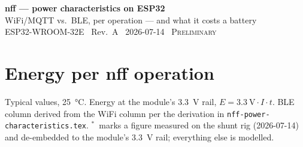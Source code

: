 \documentclass[10pt,a4paper]{article}
\newcommand{\meas}{\textcolor{ok}{$^{\ast}$}}
\begin{document}
{\LARGE\textbf{nff --- power characteristics on ESP32}}\\[1.5mm]
{\large WiFi/MQTT vs.\ BLE, per operation --- and what it costs a battery}\\[1mm]
{\small ESP32-WROOM-32E \textbullet\ Rev.\ A \textbullet\ 2026-07-14 \textbullet\ \textsc{Preliminary}}


\section{Energy per nff operation}
\label{sec:ops}

Typical values, \SI{25}{\celsius}. Energy at the module's \SI{3.3}{\volt} rail,
$E = \SI{3.3}{\volt}\cdot I\cdot t$. BLE column derived from the WiFi column per the derivation in
\texttt{nff-power-characteristics.tex}. \meas\ marks a figure measured on the shunt rig
(2026-07-14) and de-embedded to the module's \SI{3.3}{\volt} rail; everything else is modelled.
\end{document}
